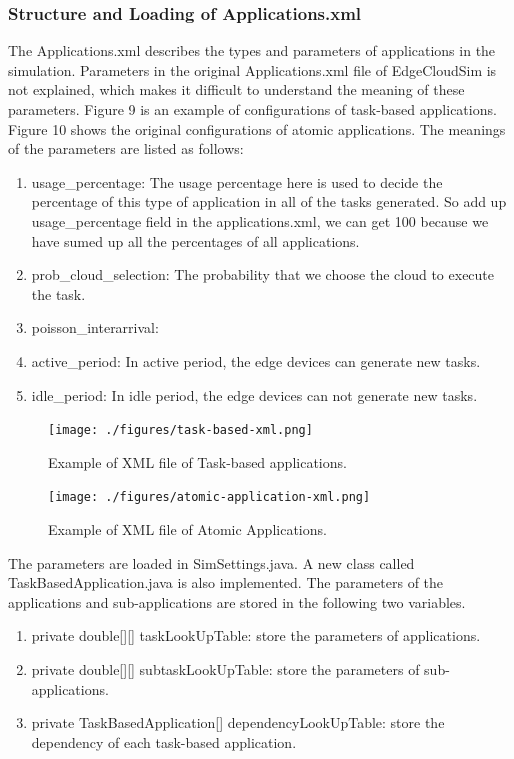 \subsubsection{Structure and Loading of Applications.xml}
The Applications.xml describes the types and parameters of applications in the simulation. Parameters in the original Applications.xml file of EdgeCloudSim is not explained, which makes it difficult to understand the meaning of these parameters. Figure 9 is an example of configurations of task-based applications. Figure 10 shows the original configurations of atomic applications.
The meanings of the parameters are listed as follows:

\begin{enumerate}
	\item usage\_percentage: The usage percentage here is used to decide the percentage of this type of application in all of the tasks generated. So add up usage\_percentage field in the applications.xml, we can get 100 because we have sumed up all the percentages of all applications.
	\item prob\_cloud\_selection: The probability that we choose the cloud to execute the task.
	\item poisson\_interarrival:
	\item active\_period: In active period, the edge devices can generate new tasks.
	\item idle\_period: In idle period, the edge devices can not generate new tasks.
\end{enumerate}

\begin{figure}
	\centering
	\texttt{[image: ./figures/task-based-xml.png]}
	\caption{\label{fig:frog}Example of XML file of Task-based applications.}
\end{figure}

\begin{figure}
	\centering
	\texttt{[image: ./figures/atomic-application-xml.png]}
	\caption{\label{fig:frog}Example of XML file of Atomic Applications.}
\end{figure}

The parameters are loaded in SimSettings.java. A new class called TaskBasedApplication.java is also implemented. The parameters of the applications and sub-applications are stored in the following two variables.

\begin{enumerate}
	\item private double[][] taskLookUpTable: store the parameters of applications.
	\item private double[][] subtaskLookUpTable: store the parameters of sub-applications.
	\item private TaskBasedApplication[] dependencyLookUpTable: store the dependency of each task-based application.
\end{enumerate}



